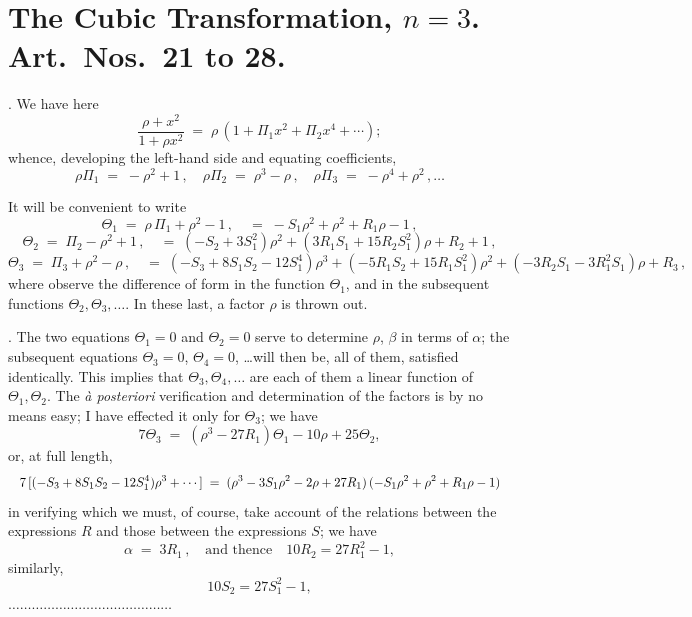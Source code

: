\documentclass[11pt]{article}
\begin{document}
\bigskip

\section*{The Cubic Transformation, $n=3$. Art.\ Nos.\ 21 to 28.}

. We have here
\[
\frac{\rho + x^2}{1 + \rho x^2} \;=\; \rho\,(1 + \Pi_1 x^2 + \Pi_2 x^4 + \cdots);
\]
whence, developing the left-hand side and equating coefficients,
\[
\rho\Pi_1 \;=\; -\rho^2 + 1\,,\quad \rho\Pi_2 \;=\; \rho^3 - \rho\,,\quad \rho\Pi_3 \;=\; -\rho^4 + \rho^2\,,\ldots
\]

\newpage

\noindent It will be convenient to write
\[
\Theta_1 \;=\; \rho\,\Pi_1 + \rho^2 - 1\,,\quad =\; -S_1\rho^2 + \rho^2 + R_1\rho - 1\,,
\]
\[
\Theta_2 \;=\; \Pi_2 - \rho^2 + 1\,,\quad =\; (-S_2 + 3 S_1^2)\rho^2 + (3 R_1 S_1 + 15 R_2 S_1^2)\rho + R_2 + 1\,,
\]
\[
\Theta_3 \;=\; \Pi_3 + \rho^2 - \rho\,,\quad =\; (-S_3 + 8 S_1 S_2 - 12 S_1^4)\rho^3 + (-5 R_1 S_2 + 15 R_1 S_1^2)\rho^2 + (-3 R_2 S_1 - 3 R_1^2 S_1)\rho + R_3\,,
\]
where observe the difference of form in the function $\Theta_1$, and in the subsequent functions $\Theta_2, \Theta_3, \ldots$. In these last, a factor $\rho$ is thrown out.

\medskip

. The two equations $\Theta_1 = 0$ and $\Theta_2 = 0$ serve to determine $\rho$, $\beta$ in terms of $\alpha$; the subsequent equations $\Theta_3 = 0$, $\Theta_4 = 0$, \ldots will then be, all of them, satisfied identically. This implies that $\Theta_3, \Theta_4, \ldots$ are each of them a linear function of $\Theta_1, \Theta_2$. The \textit{\`a posteriori} verification and determination of the factors is by no means easy; I have effected it only for $\Theta_3$; we have
\[
7\Theta_3 \;=\; (\rho^3 - 27 R_1)\Theta_1 - 10\rho + 25\Theta_2,
\]
or, at full length,
\[
\resizebox{\textwidth}{!}{$\displaystyle
7\,[(-S_3 + 8 S_1 S_2 - 12 S_1^4)\rho^3 + \cdots] \;=\; (\rho^3 - 3 S_1\rho^2 - 2\rho + 27 R_1)\,(-S_1\rho^2 + \rho^2 + R_1\rho - 1)
$}
\]
in verifying which we must, of course, take account of the relations between the expressions $R$ and those between the expressions $S$; we have
\[
\alpha \;=\; 3 R_1\,,\quad\text{and thence}\quad 10 R_2 = 27 R_1^2 - 1,
\]
similarly,
\[
10 S_2 = 27 S_1^2 - 1,
\]
\hspace{2em}$\ldots\ldots\ldots\ldots\ldots\ldots\ldots\ldots\ldots\ldots\ldots\ldots\ldots\ldots$
\end{document}
